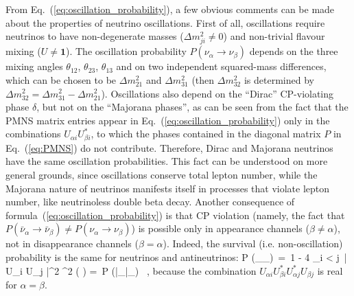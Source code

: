 From Eq.~(\ref{eq:oscillation_probability}), a few obvious comments can be made
about the properties of neutrino oscillations. First of all, oscillations require neutrinos
to have non-degenerate masses ($\Delta m^2_{ji} \neq 0$) and non-trivial flavour
mixing ($U \neq \mathbf{1}$). The oscillation probability $P (\nu_\alpha \to \nu_\beta)$
depends on the three mixing angles $\theta_{12}$, $\theta_{23}$, $\theta_{13}$
and on two independent squared-mass differences, which can be chosen to be
$\Delta m^2_{21}$ and $\Delta m^2_{31}$ (then $\Delta m^2_{32}$ is determined
by $\Delta m^2_{32} = \Delta m^2_{31} - \Delta m^2_{21}$).
Oscillations also depend on the ``Dirac'' CP-violating phase $\delta$, but not
on the ``Majorana phases'', as can be seen from the fact that the PMNS matrix
entries appear in Eq.~(\ref{eq:oscillation_probability}) only
in the combinations $U_{\alpha i} U^*_{\beta i}$, to which the phases contained
in the diagonal matrix $P$ in Eq.~(\ref{eq:PMNS}) do not contribute.
Therefore, Dirac and Majorana
neutrinos have the same oscillation probabilities. This fact can be understood
on more general grounds, since oscillations %
conserve total lepton number,
while the Majorana nature of neutrinos manifests itself in processes that violate
lepton number, like neutrinoless double beta decay.
%
Another consequence of formula~(\ref{eq:oscillation_probability}) is that
CP violation (namely, the fact that
$P (\bar \nu_\alpha \to \bar \nu_\beta) \neq P (\nu_\alpha \to \nu_\beta)$)
is possible only in appearance channels ($\beta \neq \alpha$), not in disappearance
channels ($\beta = \alpha$). Indeed, the survival (i.e. non-oscillation) probability
is the same for neutrinos and antineutrinos:
%
\bea
  P (\nu_\alpha \to \nu_\alpha)\, =\, 1 - 4 \sum_{i < j}\, \left| U_{\alpha i} U_{\alpha j} \right|^2
    \sin^2 \left(  \right) =\, P (\bar \nu_\alpha \to \bar \nu_\alpha) \, ,
\eea
%
because the combination $U_{\alpha i} U^*_{\beta i} U^*_{\alpha j} U_{\beta j}$
is real for $\alpha = \beta$.

